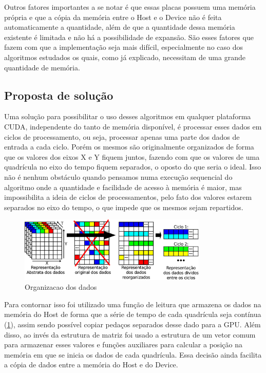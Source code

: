 Outros fatores importantes a se notar é que essas placas possuem uma memória própria e que a cópia da memória entre o Host e o Device não é feita automaticamente a quantidade, além de que a quantidade dessa memória existente é limitada e não há a possibilidade de expansão. São esses fatores que fazem com que a implementação seja mais difícil, especialmente no caso dos algoritmos estudados os quais, como já explicado, necessitam de uma grande quantidade de memória.

\subsection{Proposta de solução}\label{cap:proposta_solucao}

Uma solução para possibilitar o uso desses algoritmos em qualquer plataforma CUDA, independente do tanto de memória disponível, é processar esses dados em ciclos de processamento, ou seja, processar apenas uma parte dos dados de entrada a cada ciclo. Porém os mesmos são originalmente organizados de forma que os valores dos eixos X e Y fiquem juntos, fazendo com que os valores de uma quadrícula no eixo do tempo fiquem separados, o oposto do que seria o ideal. Isso não é nenhum obstáculo quando pensamos numa execução sequencial do algoritmo onde a quantidade e facilidade de acesso à memória é maior, mas impossibilita a ideia de ciclos de processamentos, pelo fato dos valores estarem separados no eixo do tempo, o que impede que os mesmos sejam repartidos.

\begin{figure}[H]
\centering
\includegraphics[width=0.8\textwidth]{Imagens/organizacao_dados/organizacao_dados.png}
\caption{Organizacao dos dados}
\label{fig:organizacao_dados_2}
\end{figure}

Para contornar isso foi utilizado uma função de leitura que armazena os dados na memória do Host de forma que a série de tempo de cada quadrícula seja contínua (\ref{fig:organizacao_dados_2}), assim sendo possível copiar pedaços separados desse dado para a GPU. Além disso, ao invés da estrutura de matriz foi usado a estrutura de um vetor comum para armazenar esses valores e funções auxiliares para calcular a posição na memória em que se inicia os dados de cada quadrícula. Essa decisão ainda facilita a cópia de dados entre a memória do Host e do Device.

